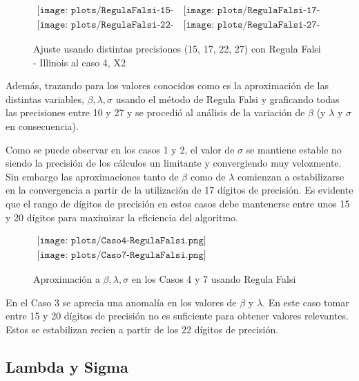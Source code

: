 \begin{figure} [H]
$\begin{array}{cc}
\texttt{[image: plots/RegulaFalsi-15-caso4.png]} &
\texttt{[image: plots/RegulaFalsi-17-caso4.png]} \\
\texttt{[image: plots/RegulaFalsi-22-caso4.png]} &
\texttt{[image: plots/RegulaFalsi-27-caso4.png]}
\end{array}$
\caption{Ajuste usando distintas precisiones (15, 17, 22, 27) con Regula 
Falsi - Illinois al caso 4, X2}
\label{fig:FitCaso4RegulaFalsi}
\end{figure}


Adem\'as, trazando para los valores conocidos como es la aproximaci\'on de las 
distintas variables, $\beta, \lambda, \sigma$ usando el m\'etodo de Regula Falsi
y graficando todas las precisiones entre 10 y 27 y se procedi\'o al an\'alisis de
la variaci\'on de $\beta$ (y $\lambda$ y $\sigma$ en consecuencia).

Como se puede observar en los casos 1 y 2, el valor de $\sigma$ se mantiene 
estable no siendo la precisi\'on de los c\'alculos un limitante y convergiendo 
muy velozmente. Sin embargo las aproximaciones tanto de $\beta$ como de $\lambda$ 
comienzan a estabilizarse en la convergencia a partir de la utilizaci\'on de 17 
d\'igitos de precisi\'on. Es evidente que el rango de d\'igitos de precisi\'on en 
estos casos debe mantenerse entre unos 15 y 20 d\'igitos para maximizar la 
eficiencia del algoritmo.  

\begin{figure} [H]
$\begin{array}{c}
\texttt{[image: plots/Caso4-RegulaFalsi.png]} \\
\texttt{[image: plots/Caso7-RegulaFalsi.png]}
\end{array}$

\caption{Aproximaci\'on a $\beta, \lambda, \sigma$ en los Casos 4 y 7 usando 
Regula Falsi}
\label{fig:FitCaso4Y7RegulaFalsi}
\end{figure}

En el Caso 3 se aprecia una anomal\'ia en los valores de $\beta$ y $\lambda$.
En este caso tomar entre 15 y 20 d\'igitos de precisi\'on no es suficiente para 
obtener valores relevantes. Estos se estabilizan recien a partir de los 22 
d\'igitos de precisi\'on.

\subsection{Lambda y Sigma}

